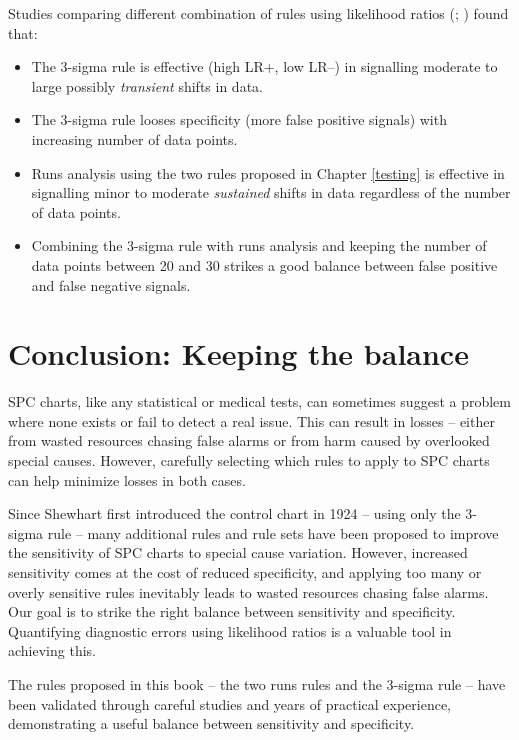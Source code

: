 \documentclass[
]{book}
\begin{document}
Studies comparing different combination of rules using likelihood ratios (; ) found that:

\begin{itemize}
\item
  The 3-sigma rule is effective (high LR+, low LR--) in signalling moderate to large possibly \emph{transient} shifts in data.
\item
  The 3-sigma rule looses specificity (more false positive signals) with increasing number of data points.
\item
  Runs analysis using the two rules proposed in Chapter \ref{testing} is effective in signalling minor to moderate \emph{sustained} shifts in data regardless of the number of data points.
\item
  Combining the 3-sigma rule with runs analysis and keeping the number of data points between 20 and 30 strikes a good balance between false positive and false negative signals.
\end{itemize}

\section{Conclusion: Keeping the balance}\label{conclusion-keeping-the-balance}

SPC charts, like any statistical or medical tests, can sometimes suggest a problem where none exists or fail to detect a real issue. This can result in losses -- either from wasted resources chasing false alarms or from harm caused by overlooked special causes. However, carefully selecting which rules to apply to SPC charts can help minimize losses in both cases.

Since Shewhart first introduced the control chart in 1924 -- using only the 3-sigma rule -- many additional rules and rule sets have been proposed to improve the sensitivity of SPC charts to special cause variation. However, increased sensitivity comes at the cost of reduced specificity, and applying too many or overly sensitive rules inevitably leads to wasted resources chasing false alarms. Our goal is to strike the right balance between sensitivity and specificity. Quantifying diagnostic errors using likelihood ratios is a valuable tool in achieving this.

The rules proposed in this book -- the two runs rules and the 3-sigma rule -- have been validated through careful studies and years of practical experience, demonstrating a useful balance between sensitivity and specificity.
\end{document}
